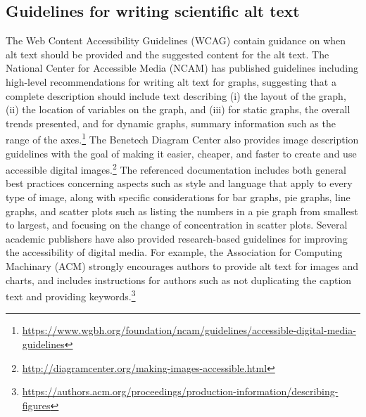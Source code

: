 \documentclass[sigconf]{acmart}
\begin{document}
\subsection{Guidelines for writing scientific alt text}
\label{sec:rw_guidelines}

The Web Content Accessibility Guidelines (WCAG) \citep{Chisholm2001WebCA, Caldwell2008WebCA} contain guidance on when alt text should be provided and the suggested content for the alt text. The National Center for Accessible Media (NCAM) has published guidelines including high-level recommendations for writing alt text for graphs, suggesting that a complete description should include text describing (i) the layout of the graph, (ii) the location of variables on the graph, and (iii) for static graphs, the overall trends presented, and for dynamic graphs, summary information such as the range of the axes.\footnote{\href{https://www.wgbh.org/foundation/ncam/guidelines/accessible-digital-media-guidelines}{https://www.wgbh.org/foundation/ncam/guidelines/accessible-digital-media-guidelines}} The Benetech Diagram Center also provides image description guidelines with the goal of making it easier, cheaper, and faster to create and use accessible digital images.\footnote{\href{http://diagramcenter.org/making-images-accessible.html}{http://diagramcenter.org/making-images-accessible.html}} The referenced documentation includes 
both general best practices concerning aspects such as style and language that apply to every type of image, along with specific considerations for bar graphs, pie graphs, line graphs, and scatter plots such as listing the numbers in a pie graph from smallest to largest, and focusing on the change of concentration in scatter plots. Several academic publishers have also provided research-based guidelines for improving the accessibility of digital media. For example, the Association for Computing Machinary (ACM) strongly encourages authors to provide alt text for images and charts, and includes instructions for authors such as not duplicating the caption text and providing keywords.\footnote{\href{https://authors.acm.org/proceedings/production-information/describing-figures}{https://authors.acm.org/proceedings/production-information/describing-figures}}
\end{document}
